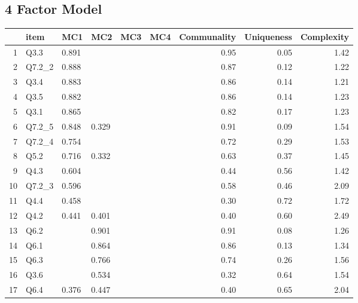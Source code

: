 \documentclass[../main.tex]{subfiles}
\begin{document}
        \subsection{4 Factor Model}

            \begin{table}[ht]
                \centering
                \begin{tabular}{rlllllrrr}
                    \hline
                    & item & MC1 & MC2 & MC3 & MC4 & Communality & Uniqueness & Complexity \\
                    \hline
                    1 & Q3.3 & 0.891 &  &  &  & 0.95 & 0.05 & 1.42 \\
                    2 & Q7.2\_2 & 0.888 &  &  &  & 0.87 & 0.12 & 1.22 \\
                    3 & Q3.4 & 0.883 &  &  &  & 0.86 & 0.14 & 1.21 \\
                    4 & Q3.5 & 0.882 &  &  &  & 0.86 & 0.14 & 1.23 \\
                    5 & Q3.1 & 0.865 &  &  &  & 0.82 & 0.17 & 1.23 \\
                    6 & Q7.2\_5 & 0.848 & 0.329 &  &  & 0.91 & 0.09 & 1.54 \\
                    7 & Q7.2\_4 & 0.754 &  &  &  & 0.72 & 0.29 & 1.53 \\
                    8 & Q5.2 & 0.716 & 0.332 &  &  & 0.63 & 0.37 & 1.45 \\
                    9 & Q4.3 & 0.604 &  &  &  & 0.44 & 0.56 & 1.42 \\
                    10 & Q7.2\_3 & 0.596 &  &  &  & 0.58 & 0.46 & 2.09 \\
                    11 & Q4.4 & 0.458 &  &  &  & 0.30 & 0.72 & 1.72 \\
                    12 & Q4.2 & 0.441 & 0.401 &  &  & 0.40 & 0.60 & 2.49 \\
                    13 & Q6.2 &  & 0.901 &  &  & 0.91 & 0.08 & 1.26 \\
                    14 & Q6.1 &  & 0.864 &  &  & 0.86 & 0.13 & 1.34 \\
                    15 & Q6.3 &  & 0.766 &  &  & 0.74 & 0.26 & 1.56 \\
                    16 & Q3.6 &  & 0.534 &  &  & 0.32 & 0.64 & 1.54 \\
                    17 & Q6.4 & 0.376 & 0.447 &  &  & 0.40 & 0.65 & 2.04 \\

\end{tabular}
\end{table}
\end{document}

